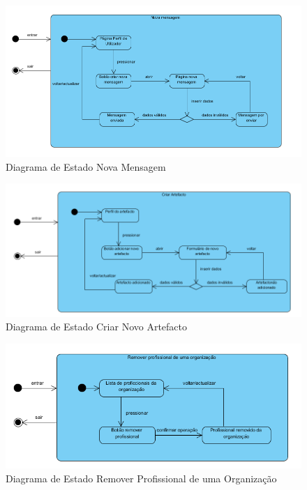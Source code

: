 \documentclass[12pt,a4paper]{article}
\begin{document}
\begin{figure}[h!]
\centering
\includegraphics[scale=0.7]{estado/novamensagem}
\caption{Diagrama de Estado Nova Mensagem} 
\end{figure} 

\begin{figure}[h!]
\centering
\includegraphics[scale=0.7]{estado/criarartefacto}
\caption{Diagrama de Estado Criar Novo Artefacto} 
\end{figure} 
  
\begin{figure}[h!]
\centering
\includegraphics[scale=0.8]{estado/removerprofissional}
\caption{Diagrama de Estado Remover Profissional de uma Organização} 
\end{figure}   
  
\end{document}
